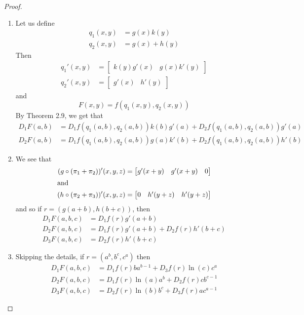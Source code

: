 \begin{enumerate}
    \begin{proof}
    \begin{enumerate}
        \item Let us define
        \begin{align*}
            q_1(x,y) &= g(x)k(y) \\
            q_2(x,y) &= g(x) + h(y)
        \end{align*}
        Then
        \begin{align*}
            q_1'(x,y) &= \begin{bmatrix} k(y)g'(x) & g(x)k'(y) \end{bmatrix} \\
            q_2'(x,y) &= \begin{bmatrix} g'(x) & h'(y) \end{bmatrix}
        \end{align*}
        and 
        \[
        F(x,y) = f(q_1(x,y), q_2(x,y))
        \]
        By Theorem 2.9, we get that
        \begin{align*}
            D_1F(a,b) &= D_1f(q_1(a,b), q_2(a,b))k(b)g'(a) + D_2f(q_1(a,b), q_2(a,b))g'(a) \\
            D_2F(a,b) &= D_1f(q_1(a,b), q_2(a,b))g(a)k'(b) + D_2f(q_1(a,b), q_2(a,b))h'(b)
        \end{align*}
        
        \item We see that
        \begin{align*}
            (g \circ (\pi_1+\pi_2))'(x,y,z) &= \begin{bmatrix} g'(x+y) & g'(x+y) & 0 \end{bmatrix} \\
            \intertext{and}
            (h \circ (\pi_2+\pi_3))'(x,y,z) &= \begin{bmatrix} 0 & h'(y+z) & h'(y+z) \end{bmatrix}
        \end{align*}
        and so if \( r = (g(a+b), h(b+c) ) \), then
        \begin{align*}
            D_1F(a,b,c) &= D_1f(r)g'(a+b) \\
            D_2F(a,b,c) &= D_1f(r)g'(a+b)+D_2f(r)h'(b+c) \\
            D_3F(a,b,c) &= D_2f(r)h'(b+c)
        \end{align*}
        
        \item Skipping the details, if \( r = (a^b, b^c, c^a) \) then
        \begin{align*}
            D_1F(a,b,c) &= D_1f(r) ba^{b-1}+D_3f(r)\ln(c)c^a \\
            D_2F(a,b,c) &= D_1f(r) \ln(a)a^b + D_2f(r)cb^{c-1} \\
            D_3F(a,b,c) &= D_2f(r)\ln(b)b^c+D_3f(r)ac^{a-1}
        \end{align*}
        

\end{enumerate}
\end{proof}
\end{enumerate}
